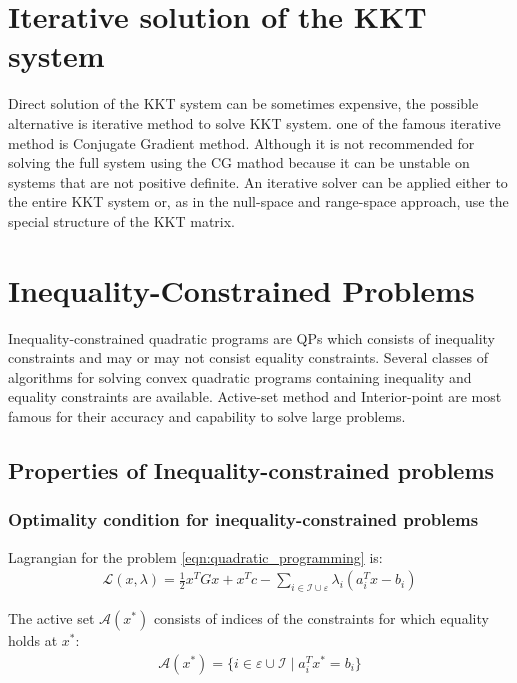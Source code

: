 \section{Iterative solution of the KKT system}
Direct solution of the KKT system can be sometimes expensive, the possible alternative is iterative method to solve KKT system. one of the famous iterative method is Conjugate Gradient method. Although it is not recommended for solving the full system using the CG mathod because it can be unstable on systems that are not positive definite. An iterative solver can be applied either to the entire KKT system or, as in the null-space and range-space approach, use the special structure of the KKT matrix.

\section{Inequality-Constrained Problems}
Inequality-constrained quadratic programs are QPs which consists of inequality constraints and may or may not consist equality constraints. Several classes of algorithms for solving convex quadratic programs containing inequality and equality constraints are available. Active-set method and Interior-point are most famous for their accuracy and capability to solve large problems.

\subsection{Properties of Inequality-constrained problems}
\subsubsection*{Optimality condition for inequality-constrained problems}
Lagrangian for the problem \ref{eqn:quadratic_programming} is:
\begin{equation}
	\begin{aligned}
		\mathcal{L}(x,\lambda ) = \frac{1}{2}x^TGx + x^Tc-\sum_{i\in \mathcal{I}\cup \varepsilon} \lambda_i(a_i^Tx-b_i)
	\end{aligned}
	\label{eqn:Lagrangian_for_QP_1}
\end{equation}

The active set $\mathcal{A}(x^*)$ consists of indices of the constraints for which equality holds at $x^*$:
\begin{equation}
	\begin{aligned}
		\mathcal{A}(x^*) = \lbrace i\in \varepsilon \cup \mathcal{I}\mid a_i^Tx^* = b_i \rbrace
	\end{aligned}
\end{equation}

